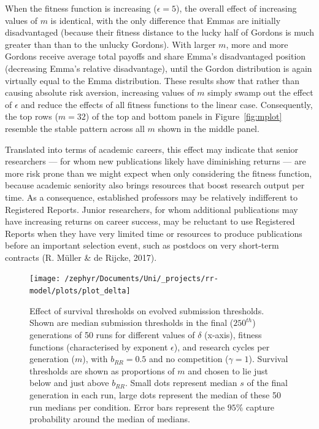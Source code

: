 \documentclass[british,,man,mask,floatsintext]{apa6}
\begin{document}
When the fitness function is increasing (\(\epsilon = 5\)), the overall effect of increasing values of \(m\) is identical, with the only difference that Emmas are initially disadvantaged (because their fitness distance to the lucky half of Gordons is much greater than than to the unlucky Gordons).
With larger \(m\), more and more Gordons receive average total payoffs and share Emma's disadvantaged position (decreasing Emma's relative disadvantage), until the Gordon distribution is again virtually equal to the Emma distribution.
These results show that rather than causing absolute risk aversion, increasing values of \(m\) simply swamp out the effect of \(\epsilon\) and reduce the effects of all fitness functions to the linear case.
Consequently, the top rows (\(m = 32\)) of the top and bottom panels in Figure~\ref{fig:mplot} resemble the stable pattern across all \(m\) shown in the middle panel.

Translated into terms of academic careers, this effect may indicate that senior researchers --- for whom new publications likely have diminishing returns --- are more risk prone than we might expect when only considering the fitness function, because academic seniority also brings resources that boost research output per time.
As a consequence, established professors may be relatively indifferent to Registered Reports.
Junior researchers, for whom additional publications may have increasing returns on career success, may be reluctant to use Registered Reports when they have very limited time or resources to produce publications before an important selection event, such as postdocs on very short-term contracts (R. Müller \& de Rijcke, 2017).



\begin{figure}
\texttt{[image: /zephyr/Documents/Uni/\_projects/rr-model/plots/plot\_delta]} \caption{Effect of survival thresholds on evolved submission thresholds. Shown are median submission thresholds in the final (\(250^{th}\)) generations of 50 runs for different values of \(\delta\) (x-axis), fitness functions (characterised by exponent \(\epsilon\)), and research cycles per generation (\(m\)), with \(b_{RR} = 0.5\) and no competition (\(\gamma = 1\)). Survival thresholds are shown as proportions of \(m\) and chosen to lie just below and just above \(b_{RR}\). Small dots represent median \(s\) of the final generation in each run, large dots represent the median of these 50 run medians per condition. Error bars represent the \(95\%\) capture probability around the median of medians.}\label{fig:deltaplot}
\end{figure}
\end{document}
